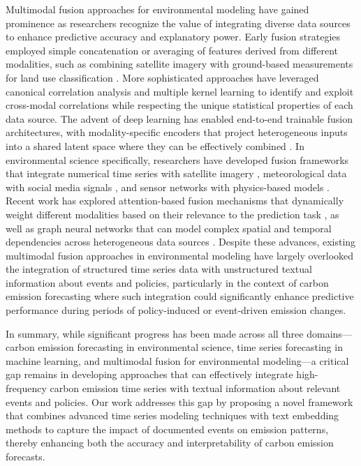 Multimodal fusion approaches for environmental modeling have gained prominence as researchers recognize the value of integrating diverse data sources to enhance predictive accuracy and explanatory power. Early fusion strategies employed simple concatenation or averaging of features derived from different modalities, such as combining satellite imagery with ground-based measurements for land use classification \cite{joshi2016review}. More sophisticated approaches have leveraged canonical correlation analysis \cite{hardoon2004canonical} and multiple kernel learning \cite{gonen2011multiple} to identify and exploit cross-modal correlations while respecting the unique statistical properties of each data source. The advent of deep learning has enabled end-to-end trainable fusion architectures, with modality-specific encoders that project heterogeneous inputs into a shared latent space where they can be effectively combined \cite{baltruvsaitis2018multimodal}. In environmental science specifically, researchers have developed fusion frameworks that integrate numerical time series with satellite imagery \cite{reichstein2019deep}, meteorological data with social media signals \cite{wang2019social}, and sensor networks with physics-based models \cite{reichstein2019deep}. Recent work has explored attention-based fusion mechanisms that dynamically weight different modalities based on their relevance to the prediction task \cite{xu2018multimodal}, as well as graph neural networks that can model complex spatial and temporal dependencies across heterogeneous data sources \cite{wu2020connecting}. Despite these advances, existing multimodal fusion approaches in environmental modeling have largely overlooked the integration of structured time series data with unstructured textual information about events and policies, particularly in the context of carbon emission forecasting where such integration could significantly enhance predictive performance during periods of policy-induced or event-driven emission changes.

In summary, while significant progress has been made across all three domains—carbon emission forecasting in environmental science, time series forecasting in machine learning, and multimodal fusion for environmental modeling—a critical gap remains in developing approaches that can effectively integrate high-frequency carbon emission time series with textual information about relevant events and policies. Our work addresses this gap by proposing a novel framework that combines advanced time series modeling techniques with text embedding methods to capture the impact of documented events on emission patterns, thereby enhancing both the accuracy and interpretability of carbon emission forecasts.
